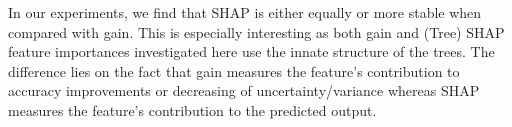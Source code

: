 In our experiments, we find that SHAP is either equally or more stable when compared with gain. This is especially interesting as both gain and (Tree) SHAP feature importances investigated here use the innate structure of the trees. The difference lies on the fact that gain measures the feature's contribution to accuracy improvements or decreasing of uncertainty/variance whereas SHAP measures the feature's contribution to the predicted output. 
 


